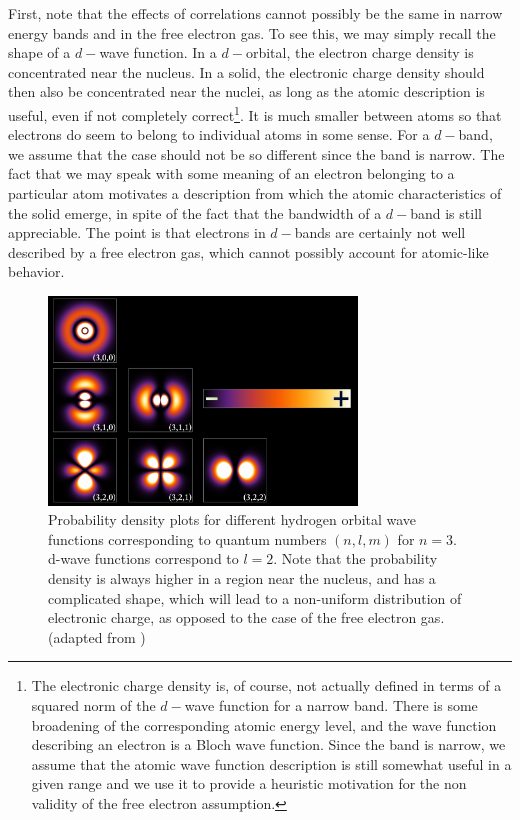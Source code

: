 First, note that the effects of correlations cannot possibly be the same in narrow energy bands and in the free electron gas. To see this, we may simply recall the shape of a $d-$wave function. In a $d-$orbital, the electron charge density is concentrated near the nucleus. In a solid, the electronic charge density should then also be concentrated near the nuclei, as long as the atomic description is useful, even if not completely correct\footnote{The electronic charge density is, of course, not actually defined in terms of a squared norm of the $d-$wave function for a narrow band. There is some broadening of the corresponding atomic energy level, and the wave function describing an electron is a Bloch wave function. Since the band is narrow, we assume that the atomic wave function description is still somewhat useful in a given range and we use it to provide a heuristic motivation for the non validity of the free electron assumption.}. It is much smaller between atoms so that electrons do seem to belong to individual atoms in some sense. For a $d-$band, we assume that the case should not be so different since the band is narrow. The fact that we may speak with some meaning of an electron belonging to a particular atom motivates a description from which the atomic characteristics of the solid emerge, in spite of the fact that the bandwidth of a $d-$band is still appreciable. The point is that electrons in $d-$bands are certainly not well described by a free electron gas, which cannot possibly account for atomic-like behavior.

\begin{figure}[H]\label{fig:hydrogenWF}
\centering
\includegraphics[width = 8.2cm]{Figures/HubbardModel/Hydrogen_Density_Plots.png}
\caption[Hydrogen atomic wave functions.]{Probability density plots for different hydrogen orbital wave functions corresponding to quantum numbers $(n, l, m)$ for $n = 3$. d-wave functions correspond to $l=2$. Note that the probability density is always higher in a region near the nucleus, and has a complicated shape, which will lead to a non-uniform distribution of electronic charge, as opposed to the case of the free electron gas. (adapted from \cite{hydrogen})}
\end{figure}

